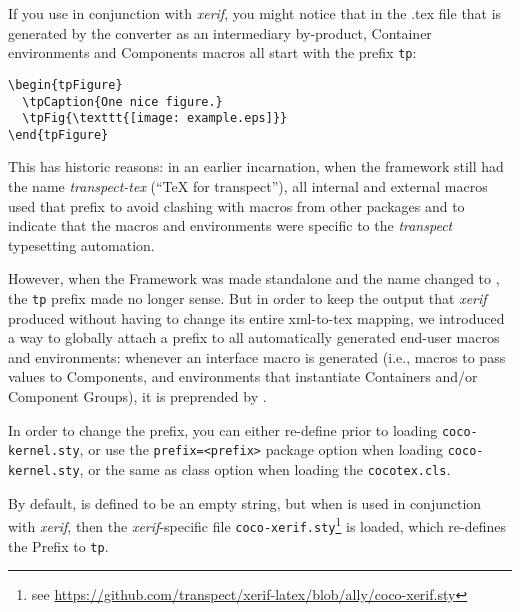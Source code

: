 If you use {\CoCoTeX} in conjunction with \textit{xerif}, you might
notice that in the .tex file that is generated by the converter as an
intermediary by-product, Container environments and Components macros
all start with the prefix \texttt{tp}:
\begin{lstlisting}
\begin{tpFigure}
  \tpCaption{One nice figure.}
  \tpFig{\texttt{[image: example.eps]}}
\end{tpFigure}
\end{lstlisting}
This has historic reasons: in an earlier incarnation, when the
{\CoCoTeX} framework still had the name \textit{transpect-tex} (“TeX
for transpect”), all internal and external macros used that prefix to
avoid clashing with macros from other packages and to indicate that
the macros and environments were specific to the \textit{transpect}
typesetting automation.

However, when the Framework was made standalone and the name changed
to \CoCoTeX, the \lstinline{tp} prefix made no longer sense. But in
order to keep the output that \textit{xerif} produced without having
to change its entire xml-to-tex mapping, we introduced a way to
globally attach a prefix to all automatically generated end-user
macros and environments: whenever an interface macro is generated
(i.e., macros to pass values to Components, and environments that
instantiate Containers and/or Component Groups), it is preprended by
\DeclareMacro{\ccPrefix}.

In order to change the prefix, you can either re-define
\UsageMacro{\ccPrefix} prior to loading \texttt{coco-kernel.sty}, or
use the \lstinline{prefix=<prefix>} package option when loading
\texttt{coco-kernel.sty}, or the same as class
option
when loading the \lstinline{cocotex.cls}.

By default, \UsageMacro{\ccPrefix} is defined to be an empty string,
but when {\CoCoTeX} is used in conjunction with \textit{xerif}, then
the \textit{xerif}-specific file \texttt{coco-xerif.sty}\footnote{see
  \url{https://github.com/transpect/xerif-latex/blob/ally/coco-xerif.sty}}
is loaded, which re-defines the Prefix to \texttt{tp}.


